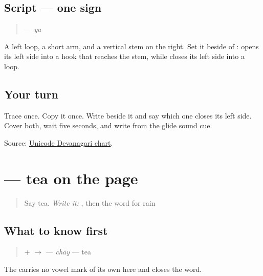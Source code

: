 \subsection*{Script — one sign}

\begin{quote}
\textbf{} — \emph{ya}
\end{quote}

A left loop, a short arm, and a vertical stem on the right. Set it beside \textbf{} of \textbf{}: \textbf{} opens its left side into a hook that reaches the stem, while \textbf{} closes its left side into a loop.

\subsection*{Your turn}
Trace \textbf{} once. Copy it once. Write \textbf{} beside it and say which one closes its left side. Cover both, wait five seconds, and write \textbf{} from the glide sound cue.

\begin{tcolorbox}[breakable,colback=teal!4,colframe=teal!35!black,title={Before you move on}]
Source: \href{https://www.unicode.org/charts/PDF/U0900.pdf}{Unicode Devanagari chart}.
\end{tcolorbox}
\section[\texorpdfstring{\mw{चाय} (chāy)}{चाय (chāy)}]{ — tea on the page}

\label{lesson:MW-C20-chaay}



\begin{quote}
Say tea. \emph{Write it:} \textbf{}, then the word for rain
\end{quote}

\subsection*{What to know first}
\begin{quote}
\textbf{} + \textbf{} $\to$ \textbf{} — \emph{chāy} — tea
\end{quote}

The \textbf{} carries no vowel mark of its own here and closes the word.

